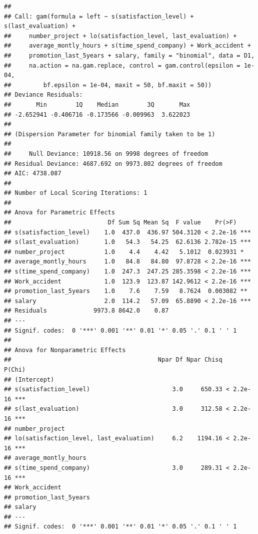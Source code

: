 \documentclass[
  11pt,
]{article}
\begin{document}
\begin{verbatim}
## 
## Call: gam(formula = left ~ s(satisfaction_level) + s(last_evaluation) + 
##     number_project + lo(satisfaction_level, last_evaluation) + 
##     average_montly_hours + s(time_spend_company) + Work_accident + 
##     promotion_last_5years + salary, family = "binomial", data = D1, 
##     na.action = na.gam.replace, control = gam.control(epsilon = 1e-04, 
##         bf.epsilon = 1e-04, maxit = 50, bf.maxit = 50))
## Deviance Residuals:
##       Min        1Q    Median        3Q       Max 
## -2.652941 -0.406716 -0.173566 -0.009963  3.622023 
## 
## (Dispersion Parameter for binomial family taken to be 1)
## 
##     Null Deviance: 10918.56 on 9998 degrees of freedom
## Residual Deviance: 4687.692 on 9973.802 degrees of freedom
## AIC: 4738.087 
## 
## Number of Local Scoring Iterations: 1 
## 
## Anova for Parametric Effects
##                           Df Sum Sq Mean Sq  F value    Pr(>F)    
## s(satisfaction_level)    1.0  437.0  436.97 504.3120 < 2.2e-16 ***
## s(last_evaluation)       1.0   54.3   54.25  62.6136 2.782e-15 ***
## number_project           1.0    4.4    4.42   5.1012  0.023931 *  
## average_montly_hours     1.0   84.8   84.80  97.8728 < 2.2e-16 ***
## s(time_spend_company)    1.0  247.3  247.25 285.3598 < 2.2e-16 ***
## Work_accident            1.0  123.9  123.87 142.9612 < 2.2e-16 ***
## promotion_last_5years    1.0    7.6    7.59   8.7624  0.003082 ** 
## salary                   2.0  114.2   57.09  65.8890 < 2.2e-16 ***
## Residuals             9973.8 8642.0    0.87                       
## ---
## Signif. codes:  0 '***' 0.001 '**' 0.01 '*' 0.05 '.' 0.1 ' ' 1
## 
## Anova for Nonparametric Effects
##                                         Npar Df Npar Chisq    P(Chi)    
## (Intercept)                                                             
## s(satisfaction_level)                       3.0     650.33 < 2.2e-16 ***
## s(last_evaluation)                          3.0     312.58 < 2.2e-16 ***
## number_project                                                          
## lo(satisfaction_level, last_evaluation)     6.2    1194.16 < 2.2e-16 ***
## average_montly_hours                                                    
## s(time_spend_company)                       3.0     289.31 < 2.2e-16 ***
## Work_accident                                                           
## promotion_last_5years                                                   
## salary                                                                  
## ---
## Signif. codes:  0 '***' 0.001 '**' 0.01 '*' 0.05 '.' 0.1 ' ' 1
\end{verbatim}
\end{document}
